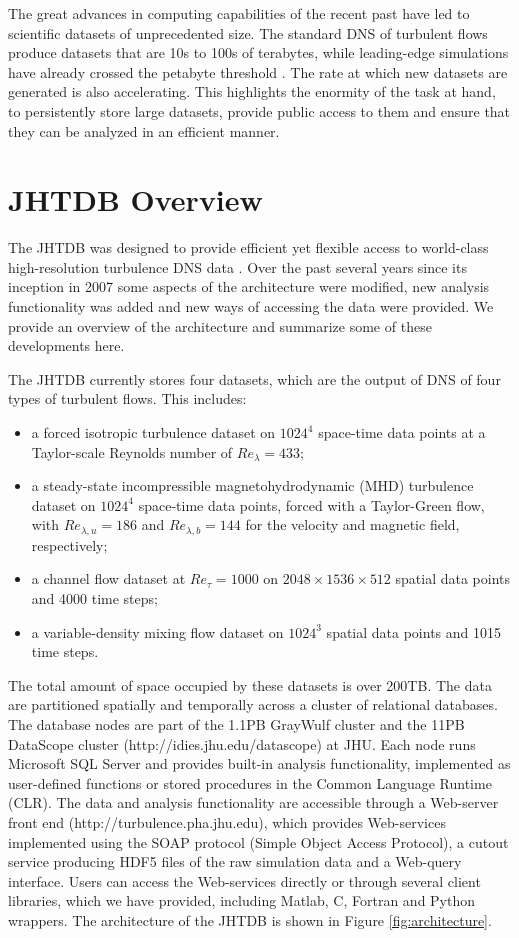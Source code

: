 \documentclass[10pt,twocolumn]{article}
\begin{document}
The great advances in computing capabilities of the recent past have led to scientific datasets of unprecedented size. The standard DNS of turbulent flows
produce datasets that are 10s to 100s of terabytes, while leading-edge simulations have already crossed the petabyte threshold \cite{Lee}. The rate at
which new datasets are generated is also accelerating. This highlights the enormity of the task at hand, to persistently store large datasets, provide public access
to them and ensure that they can be analyzed in an efficient manner. 

\section{JHTDB Overview}

The JHTDB was designed to provide efficient yet flexible access to world-class high-resolution turbulence DNS data \cite{Yi, Perlman}. Over the past
several years since its inception in 2007 some aspects of the architecture were modified, new analysis functionality was added and new ways of accessing
the data were provided. We provide an overview of the architecture and summarize some of these developments here.

The JHTDB currently stores four datasets, which are the output of DNS of four types of turbulent flows. This includes: 
\begin{itemize}
\item a forced isotropic turbulence dataset on $1024^4$ space-time data points at a Taylor-scale Reynolds number of $Re_{\lambda} = 433$;
\item a steady-state incompressible magnetohydrodynamic (MHD) turbulence dataset on $1024^4$  space-time data points, forced with a Taylor-Green flow,
with $Re_{\lambda , u} = 186$  and $Re_{\lambda , b} = 144$ for the velocity and magnetic field, respectively;
\item a channel flow dataset at $Re_\tau = 1000$ on $2048 \times 1536 \times 512$ spatial data points and 4000 time steps;
\item a variable-density mixing flow dataset on $1024^3$ spatial data points and 1015 time steps.
\end{itemize}
The total amount of space occupied by these datasets is over 200TB. The data are partitioned spatially and temporally across a cluster of relational
databases. The database nodes are part of the 1.1PB GrayWulf cluster \cite{Szalay} and the 11PB DataScope cluster (http://idies.jhu.edu/datascope) at JHU.
Each node runs Microsoft SQL Server and provides built-in analysis functionality, implemented as user-defined functions or stored procedures in the
Common Language Runtime (CLR). The data and analysis functionality are accessible through a Web-server front end (http://turbulence.pha.jhu.edu), 
which provides Web-services implemented using the SOAP protocol (Simple Object Access Protocol), a cutout service producing HDF5 files of the raw
simulation data and a Web-query interface. Users can access the Web-services directly or through several client libraries, which we have provided, 
including Matlab, C, Fortran and Python wrappers. The architecture of the JHTDB is shown in Figure \ref{fig:architecture}.
\end{document}
